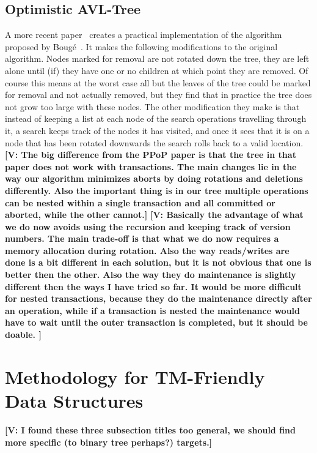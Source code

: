 \documentclass[10pt]{sigplanconf}
\newcommand{\vincent}[1]{{\bf [V: #1]}}
\begin{document}
\subsection{Optimistic AVL-Tree}
A more recent paper~\cite{BCCO10} creates a practical implementation of the algorithm proposed by Boug\'e~\cite{IRISAppr}.
It makes the following modifications to the original algorithm.
Nodes marked for removal are not rotated down the tree, they are left alone until (if) they have one or no children at which point they are removed.
Of course this means at the worst case all but the leaves of the tree could be marked for removal and not actually removed, but they find that in practice the tree does not grow too large with these nodes.
The other modification they make is that instead of keeping a list at each node of the search operations travelling through it, a search keeps track of the nodes it has visited, and once it sees that it is on a node that has been rotated downwards the search rolls back to a valid location.
\vincent{The big difference from the PPoP paper is that the tree in that paper does not work with transactions.
The main changes lie in the way our algorithm minimizes aborts by doing rotations and deletions differently.
Also the important thing is in our tree multiple operations can be nested within a single transaction and all committed or aborted, while the other cannot.}
\vincent{Basically the advantage of what we do now avoids using the recursion and keeping track of version numbers. The main trade-off is that what we do now requires a memory allocation during rotation.  Also the way reads/writes are done is a bit different in each solution, but it is not obvious that one is better then the other.
Also the way they do maintenance is slightly different then the ways I have tried so far.  It would be more difficult for nested transactions, because they do the maintenance directly after an operation, while if a transaction is nested the maintenance would have to wait until the outer transaction is completed, but it should be doable.
}

\section{Methodology for TM-Friendly Data Structures}

\vincent{I found these three subsection titles too general, we should find more specific (to binary tree perhaps?) targets.}
\end{document}
